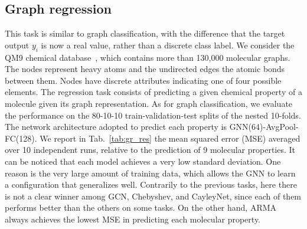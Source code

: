 \documentclass{article}
\begin{document}
\subsection{Graph regression}
This task is similar to graph classification, with the difference that the target output $y_i$ is now a real value, rather than a discrete class label.
We consider the QM9 chemical database~\cite{ramakrishnan2014quantum}, which contains more than 130,000 molecular graphs.
The nodes represent heavy atoms and the undirected edges the atomic bonds between them. 
Nodes have discrete attributes indicating one of four possible elements. 
The regression task consists of predicting a given chemical property of a molecule given its graph representation.
As for graph classification, we evaluate the performance on the 80-10-10 train-validation-test splits of the nested 10-folds.
The network architecture adopted to predict each property is GNN(64)-AvgPool-FC(128).
We report in Tab.~\ref{tab:gr_res} the mean squared error (MSE) averaged over 10 independent runs, relative to the prediction of 9 molecular properties.
It can be noticed that each model achieves a very low standard deviation. 
One reason is the very large amount of training data, which allows the GNN to learn a configuration that generalizes well.
Contrarily to the previous tasks, here there is not a clear winner among GCN, Chebyshev, and CayleyNet, since each of them performs better than the others on some tasks.
On the other hand, ARMA always achieves the lowest MSE in predicting each molecular property. 
\end{document}

